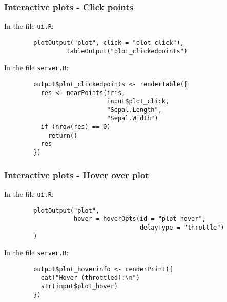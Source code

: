 \documentclass{beamer}
\begin{document}
	\begin{frame}[fragile]
		\frametitle{Interactive plots - Click points}

		In the file \verb|ui.R|:
		
		\begin{exampleblock}{}
		\begin{BVerbatim}
		plotOutput("plot", click = "plot_click"),
                 tableOutput("plot_clickedpoints")
		\end{BVerbatim}
		\end{exampleblock}{}

		\vspace{1em}

		In the file \verb|server.R|:
		
		\begin{exampleblock}{}
		\begin{BVerbatim}
		output$plot_clickedpoints <- renderTable({
		  res <- nearPoints(iris,
		                    input$plot_click,
		                    "Sepal.Length",
		                    "Sepal.Width")
		  if (nrow(res) == 0)
		    return()
		  res
		})
		\end{BVerbatim}
		\end{exampleblock}{}

	\end{frame}

	\begin{frame}[fragile]
		\frametitle{Interactive plots - Hover over plot}

		In the file \verb|ui.R|:
		
		\begin{exampleblock}{}
		\begin{BVerbatim}
		plotOutput("plot",
		           hover = hoverOpts(id = "plot_hover",
		                             delayType = "throttle")
		)
		\end{BVerbatim}
		\end{exampleblock}{}

		\vspace{1em}

		In the file \verb|server.R|:
		
		\begin{exampleblock}{}
		\begin{BVerbatim}
		output$plot_hoverinfo <- renderPrint({
		  cat("Hover (throttled):\n")
		  str(input$plot_hover)
		})  
		\end{BVerbatim}
		\end{exampleblock}{}

	\end{frame}
\end{document}
